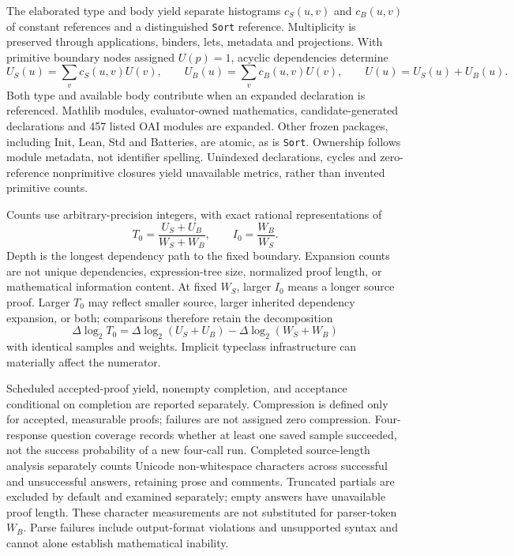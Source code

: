 The elaborated type and body yield separate histograms $c_S(u,v)$ and $c_B(u,v)$ of constant references and a distinguished \texttt{Sort} reference. Multiplicity is preserved through applications, binders, lets, metadata and projections. With primitive boundary nodes assigned $U(p)=1$, acyclic dependencies determine
\begin{equation}
 U_S(u)=\sum_v c_S(u,v)U(v),\qquad
 U_B(u)=\sum_v c_B(u,v)U(v),\qquad
 U(u)=U_S(u)+U_B(u).
\label{eq:methods-expansion}
\end{equation}
Both type and available body contribute when an expanded declaration is referenced. Mathlib modules, evaluator-owned mathematics, candidate-generated declarations and 457 listed OAI modules are expanded. Other frozen packages, including Init, Lean, Std and Batteries, are atomic, as is \texttt{Sort}. Ownership follows module metadata, not identifier spelling. Unindexed declarations, cycles and zero-reference nonprimitive closures yield unavailable metrics, rather than invented primitive counts.

Counts use arbitrary-precision integers, with exact rational representations of
\begin{equation}
 T_0=\frac{U_S+U_B}{W_S+W_B},\qquad I_0=\frac{W_B}{W_S}.
\label{eq:methods-ratios}
\end{equation}
Depth is the longest dependency path to the fixed boundary. Expansion counts are not unique dependencies, expression-tree size, normalized proof length, or mathematical information content. At fixed $W_S$, larger $I_0$ means a longer source proof. Larger $T_0$ may reflect smaller source, larger inherited dependency expansion, or both; comparisons therefore retain the decomposition
\begin{equation}
 \Delta\log_2 T_0=\Delta\log_2(U_S+U_B)-\Delta\log_2(W_S+W_B)
\label{eq:methods-decomposition}
\end{equation}
with identical samples and weights. Implicit typeclass infrastructure can materially affect the numerator.

Scheduled accepted-proof yield, nonempty completion, and acceptance conditional on completion are reported separately. Compression is defined only for accepted, measurable proofs; failures are not assigned zero compression. Four-response question coverage records whether at least one saved sample succeeded, not the success probability of a new four-call run. Completed source-length analysis separately counts Unicode non-whitespace characters across successful and unsuccessful answers, retaining prose and comments. Truncated partials are excluded by default and examined separately; empty answers have unavailable proof length. These character measurements are not substituted for parser-token $W_B$. Parse failures include output-format violations and unsupported syntax and cannot alone establish mathematical inability.

